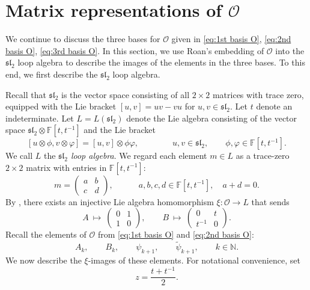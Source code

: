\documentclass[11pt]{article}%
\theoremstyle{definition}
\theoremstyle{plain}
\begin{document}
\section{Matrix representations of $\mathcal{O}$}\label{Sec:matrix-rep}
We continue to discuss the three bases for $\mathcal{O}$ given in \eqref{eq:1st basis O}, \eqref{eq:2nd basis O}, \eqref{eq:3rd basis O}.
In this section, we use Roan's embedding of $\mathcal{O}$ into the $\mathfrak{sl}_2$ loop algebra to describe the images of the elements in the three bases.
To this end, we first describe the $\mathfrak{sl}_2$ loop algebra.

\smallskip
Recall that $\mathfrak{sl}_2$ is the vector space consisting of all $2\times 2$ matrices with trace zero, equipped with the Lie bracket $[u,v]=uv-vu$ for $u,v\in\mathfrak{sl}_2$.
Let $t$ denote an indeterminate. 
Let $L=L(\mathfrak{sl}_2)$ denote the Lie algebra consisting of the vector space $\mathfrak{sl}_2 \otimes \mathbb{F}[t,t^{-1}]$ and the Lie bracket
$$
	[u \otimes \phi, v \otimes \varphi] = [u,v] \otimes \phi \varphi, \qquad \qquad u,v \in \mathfrak{sl}_2, \qquad \phi, \varphi \in \mathbb{F}[t,t^{-1}].
$$
We call $L$ the \emph{$\mathfrak{sl}_2$ loop algebra}.
We regard each element $m\in L$ as a trace-zero $2\times2$ matrix with entries in $\mathbb{F}[t, t^{-1}]$:
$$
	m = \begin{pmatrix}
	a & b \\
	c & d
	\end{pmatrix},
	\qquad \quad
	a, b, c, d \in \mathbb{F}[t,t^{-1}],
	\quad a+d = 0.
$$
By \cite[Proposition~1]{1991Roan}, there exists an injective Lie algebra homomorphism $\xi: \mathcal{O} \to L$ that sends
\begin{equation}\label{eq:image of A, B}
	A \ \longmapsto \ \begin{pmatrix} 0 & 1 \\ 1 & 0 \end{pmatrix}, \qquad
	B \ \longmapsto \ \begin{pmatrix} 0 & t \\ t^{-1} & 0 \end{pmatrix}.
\end{equation}
Recall the elements of $\mathcal{O}$ from \eqref{eq:1st basis O} and \eqref{eq:2nd basis O}:
\begin{equation*}
	A_k, \qquad B_k, \qquad \psi_{k+1}, \qquad \tilde\psi_{k+1}, \qquad k\in\mathbb{N}.
\end{equation*}
We now describe the $\xi$-images of these elements.
For notational convenience, set 
$$
	z=\frac{t+t^{-1}}{2}.
$$
\end{document}
